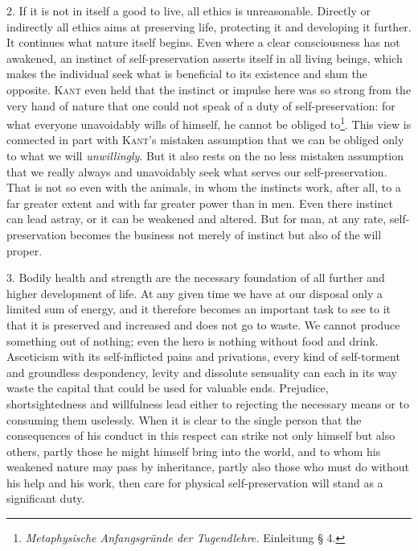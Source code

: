 \documentclass[12pt,a4paper,openany]{book}
\newcommand{\opage}[1]{\marginnote{\footnotesize\textit{[#1]}}}
\begin{document}
2. If it is not in itself a good to live, all ethics is unreasonable. Directly or indirectly all ethics aims at
preserving life, protecting it and developing it further. It continues what nature itself begins. Even where a
clear consciousness has not awakened, an instinct of self-preservation asserts itself in all living beings,
which makes the individual seek what is beneficial to its existence and shun the opposite. \textsc{Kant} even
held that the instinct or impulse here was so strong from the very hand of nature that one could not speak of
a duty of self-preservation: for what everyone unavoidably wills of himself, he cannot be obliged
to\footnote[1]{\textit{Metaphysische Anfangsgründe der Tugendlehre.} Einleitung § 4.}. This view is
connected in part with \textsc{Kant}'s mistaken assumption that we can be obliged only to what we will
\textit{unwillingly}. But it also rests on the no less mistaken assumption that we really always and
unavoidably seek what serves our self-preservation. That is
\opage{208}not so even with the animals, in whom the instincts work, after all, to a far greater extent and with far
greater power than in men. Even there instinct can lead astray, or it can be weakened and altered. But for man,
at any rate, self-preservation becomes the business not merely of instinct but also of the will proper.

3. Bodily health and strength are the necessary foundation of all further and higher development of life. At
any given time we have at our disposal only a limited sum of energy, and it therefore becomes an important task
to see to it that it is preserved and increased and does not go to waste. We cannot produce something out of
nothing; even the hero is nothing without food and drink. Asceticism with its self-inflicted pains and
privations, every kind of self-torment and groundless despondency, levity and dissolute sensuality can each in
its way waste the capital that could be used for valuable ends. Prejudice, shortsightedness and willfulness lead
either to rejecting the necessary means or to consuming them uselessly. When it is clear to the single person
that the consequences of his conduct in this respect can strike not only himself but also others, partly those
he might himself bring into the world, and to whom his weakened nature may pass by inheritance, partly also
those who must do without his help and his work, then care for physical self-preservation will stand as a
significant duty.
\end{document}
